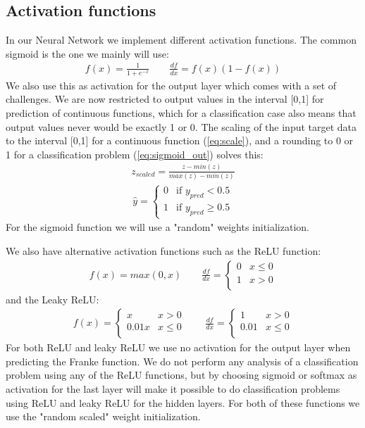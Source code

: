 \documentclass[11pt]{article}
\begin{document}
\subsection{Activation functions}
In our Neural Network we implement different activation functions. The common sigmoid is the one we mainly will use:
\begin{align*}
    f(x) = \frac{1 }{1 + e^{-x}} \quad\quad \frac{d f }{dx} = f(x) (1 - f(x))
\end{align*}
We also use this as activation for the output layer which comes with a set of challenges. We are now restricted to output values in the interval [0,1] for prediction of continuous functions, which for a classification case also means that output values never would be exactly 1 or 0. The scaling of the input target data to the interval [0,1] for a continuous function (\ref{eq:scale}), and a rounding to 0 or 1 for a classification problem (\ref{eq:sigmoid_out}) solves this:
\begin{align}
    \label{eq:scale}
    z_{scaled} = \frac{z- min(z)}{max(z)- min(z)}
\end{align}
\begin{align}
    \label{eq:sigmoid_out}
    \hat{y} =
    \begin{cases}
        0 & \text{if } y_{pred} < 0.5    \\
        1 & \text{if } y_{pred} \geq 0.5
    \end{cases}
\end{align}
For the sigmoid function we will use a "random" weights initialization.

We also have alternative activation functions such as the ReLU function:
\begin{align*}
    f(x) = max(0, x) \quad\quad \frac{df }{dx} =
    \begin{cases}
        0 & x\leq 0 \\
        1 & x > 0   \\
    \end{cases}
\end{align*}
and the Leaky ReLU:
\begin{align*}
    f(x) =
    \begin{cases}
        x     & x > 0    \\
        0.01x & x \leq 0 \\
    \end{cases}
    \quad\quad \frac{df }{dx} =
    \begin{cases}
        1    & x > 0    \\
        0.01 & x \leq 0 \\
    \end{cases}
\end{align*}
For both ReLU and leaky ReLU we use no activation for the output layer when predicting the Franke function. We do not perform any analysis of a classification problem using any of the ReLU functions, but by choosing sigmoid or softmax as activation for the last layer will make it possible to do classification problems using ReLU and leaky ReLU for the hidden layers. For both of these functions we use the "random scaled" weight initialization.
\end{document}
